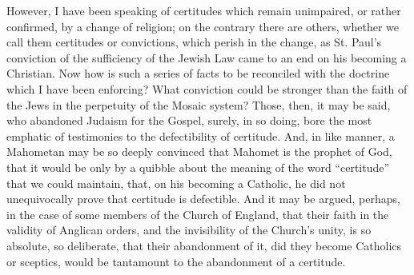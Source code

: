 However, I have been speaking of certitudes which remain
unimpaired, or rather confirmed, by a change of religion; on the
contrary there are others, whether we call them certitudes or
convictions, which perish in the change, as St. Paul's
conviction of the sufficiency of the Jewish Law came to an end on his
becoming a Christian. Now how is such a series of facts to be
reconciled with the doctrine which I have been enforcing? What
conviction could be stronger than the faith of the Jews in the
perpetuity of the Mosaic system? Those, then, it may be said, who
abandoned Judaism for the Gospel, surely, in so doing, bore the most
emphatic of testimonies to the defectibility of certitude. And, in
like manner, a Mahometan may be so deeply convinced that Mahomet is
the prophet of God, that it would be only by a quibble about the
meaning of the word ``certitude'' that we could maintain,
that, on his becoming a Catholic, he did not unequivocally prove that
certitude is defectible. And it may be argued, perhaps, in the case of
some members of the Church of England, that their faith in the
validity of Anglican orders, and the invisibility of the Church's
unity, is so absolute, so deliberate, that their abandonment of it,
did they become Catholics or sceptics, would be tantamount to the
abandonment of a certitude.

